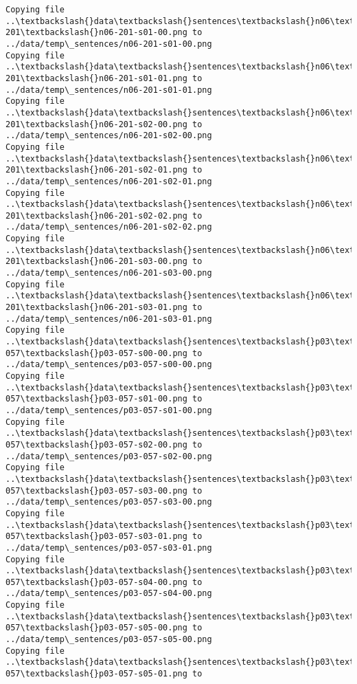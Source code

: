 \documentclass[11pt]{article}
\begin{document}
\begin{Verbatim}[commandchars=\\\{\}]
Copying file ..\textbackslash{}data\textbackslash{}sentences\textbackslash{}n06\textbackslash{}n06-201\textbackslash{}n06-201-s01-00.png to
../data/temp\_sentences/n06-201-s01-00.png
Copying file ..\textbackslash{}data\textbackslash{}sentences\textbackslash{}n06\textbackslash{}n06-201\textbackslash{}n06-201-s01-01.png to
../data/temp\_sentences/n06-201-s01-01.png
Copying file ..\textbackslash{}data\textbackslash{}sentences\textbackslash{}n06\textbackslash{}n06-201\textbackslash{}n06-201-s02-00.png to
../data/temp\_sentences/n06-201-s02-00.png
Copying file ..\textbackslash{}data\textbackslash{}sentences\textbackslash{}n06\textbackslash{}n06-201\textbackslash{}n06-201-s02-01.png to
../data/temp\_sentences/n06-201-s02-01.png
Copying file ..\textbackslash{}data\textbackslash{}sentences\textbackslash{}n06\textbackslash{}n06-201\textbackslash{}n06-201-s02-02.png to
../data/temp\_sentences/n06-201-s02-02.png
Copying file ..\textbackslash{}data\textbackslash{}sentences\textbackslash{}n06\textbackslash{}n06-201\textbackslash{}n06-201-s03-00.png to
../data/temp\_sentences/n06-201-s03-00.png
Copying file ..\textbackslash{}data\textbackslash{}sentences\textbackslash{}n06\textbackslash{}n06-201\textbackslash{}n06-201-s03-01.png to
../data/temp\_sentences/n06-201-s03-01.png
Copying file ..\textbackslash{}data\textbackslash{}sentences\textbackslash{}p03\textbackslash{}p03-057\textbackslash{}p03-057-s00-00.png to
../data/temp\_sentences/p03-057-s00-00.png
Copying file ..\textbackslash{}data\textbackslash{}sentences\textbackslash{}p03\textbackslash{}p03-057\textbackslash{}p03-057-s01-00.png to
../data/temp\_sentences/p03-057-s01-00.png
Copying file ..\textbackslash{}data\textbackslash{}sentences\textbackslash{}p03\textbackslash{}p03-057\textbackslash{}p03-057-s02-00.png to
../data/temp\_sentences/p03-057-s02-00.png
Copying file ..\textbackslash{}data\textbackslash{}sentences\textbackslash{}p03\textbackslash{}p03-057\textbackslash{}p03-057-s03-00.png to
../data/temp\_sentences/p03-057-s03-00.png
Copying file ..\textbackslash{}data\textbackslash{}sentences\textbackslash{}p03\textbackslash{}p03-057\textbackslash{}p03-057-s03-01.png to
../data/temp\_sentences/p03-057-s03-01.png
Copying file ..\textbackslash{}data\textbackslash{}sentences\textbackslash{}p03\textbackslash{}p03-057\textbackslash{}p03-057-s04-00.png to
../data/temp\_sentences/p03-057-s04-00.png
Copying file ..\textbackslash{}data\textbackslash{}sentences\textbackslash{}p03\textbackslash{}p03-057\textbackslash{}p03-057-s05-00.png to
../data/temp\_sentences/p03-057-s05-00.png
Copying file ..\textbackslash{}data\textbackslash{}sentences\textbackslash{}p03\textbackslash{}p03-057\textbackslash{}p03-057-s05-01.png to

\end{Verbatim}
\end{document}
